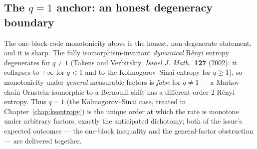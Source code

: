 \subsection*{The \texorpdfstring{\(q = 1\)}{q = 1} anchor: an honest degeneracy boundary}

The one-block-code monotonicity above is the honest, non-degenerate statement, and it is sharp. The
fully isomorphism-invariant \emph{dynamical} R\'enyi entropy degenerates for \(q \ne 1\) (Takens and
Verbitskiy, \emph{Israel J. Math.}\ \textbf{127} (2002): it collapses to \(+\infty\) for \(q < 1\)
and to the Kolmogorov--Sinai entropy for \(q \ge 1\)), so monotonicity under \emph{general}
measurable factors is \emph{false} for \(q \ne 1\) --- a Markov chain Ornstein-isomorphic to a
Bernoulli shift has a different order-\(2\) R\'enyi entropy. Thus \(q = 1\) (the Kolmogorov--Sinai
case, treated in Chapter~\ref{chap:ksentropy}) is the unique order at which the rate is monotone
under arbitrary factors, exactly the anticipated dichotomy; both of the issue's expected outcomes ---
the one-block inequality and the general-factor obstruction --- are delivered together.
